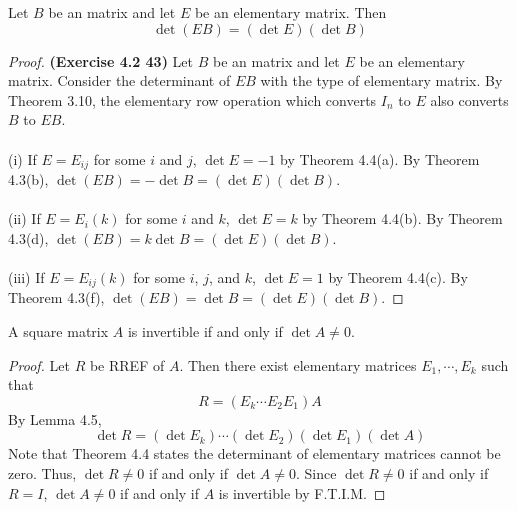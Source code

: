 \begin{lemma}
	Let $ B $ be an \nbyn matrix and let $ E $ be an \nbyn elementary matrix. Then $$ \det (EB) = \left(\det E\right)\left(\det B\right) $$
\end{lemma}
\begin{proof}
	\textbf{(Exercise 4.2 43)} Let $B$ be an \nbyn matrix and let $E$ be an \nbyn elementary matrix. Consider the determinant of $EB$ with the type of elementary matrix. By Theorem 3.10, the elementary row operation which converts $I_n$ to $E$ also converts $B$ to $EB$. \\\\
	(i) If $E = E_{ij}$ for some $i$ and $j$, $\det{E} = -1$ by Theorem 4.4(a). By Theorem 4.3(b), $\det{(EB)} = -\det{B} = (\det{E})(\det{B})$. \\\\
	(ii) If $E = E_i(k)$ for some $i$ and $k$, $\det{E} = k$ by Theorem 4.4(b). By Theorem 4.3(d), $\det{(EB)} = k\det{B} = (\det{E})(\det{B})$. \\\\
	(iii) If $E = E_{ij}(k)$ for some $i$, $j$, and $k$, $\det{E} = 1$ by Theorem 4.4(c). By Theorem 4.3(f), $\det{(EB)} = \det{B} = (\det{E})(\det{B})$.
\end{proof}

\begin{theorem}
	A square matrix $ A $ is invertible if and only if $ \det A\neq 0 $.
\end{theorem}
\begin{proof}
	Let $R$ be RREF of $A$. Then there exist elementary matrices $E_1, \cdots, E_k$ such that \begin{equation*}
		R = (E_k\cdots E_2E_1)A
	\end{equation*}
	By Lemma 4.5, \begin{equation*}
		\det{R} = (\det{E_k})\cdots(\det{E_2})(\det{E_1})(\det{A})
	\end{equation*}
	Note that Theorem 4.4 states the determinant of elementary matrices cannot be zero. Thus, $\det{R} \neq 0$ if and only if $\det{A} \neq 0$. Since $\det{R} \neq 0$ if and only if $R = I$, $\det{A} \neq 0$ if and only if $A$ is invertible by F.T.I.M.
\end{proof}


